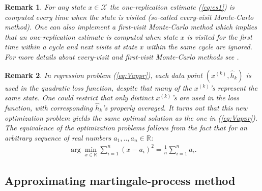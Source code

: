 \documentclass[11pt]{article}
\newcommand{\R}{\mathbb{R}}
\newcommand{\X}{\mathcal{X}}
\newtheorem{remark}{Remark}
\theoremstyle{definition}
\numberwithin{equation}{section}
\begin{document}
\begin{remark}
For any state $x\in \X$ the one-replication estimate (\ref{eq:es1}) is computed every time when the state is visited (so-called \textit{every-visit} Monte-Carlo method). One can also implement a \textit{first-visit}  Monte-Carlo method which implies that
an one-replication estimate is computed when state $x$ is visited for the first time within a cycle
 and next visits at state $x$ within the same cycle are ignored. For more details about every-visit and first-visit Monte-Carlo methods see \cite[Section 5.1]{Sutton2018}.
\end{remark}
\begin{remark}
  In regression problem (\ref{eq:Vappr}), each data point
    $(x^{(k)}, \hat h_k)$ is used  in the quadratic loss function, despite
    that many of the $x^{(k)}$'s represent the same state. One could restrict that
    \emph{only distinct} $x^{(k)}$'s are used in the loss function, with
    corresponding $\hat h_k$'s properly averaged. It turns out that this
    new optimization problem yields the same optimal solution as the one in (\ref{eq:Vappr}).
The equivalence of the optimization problems follows from the fact that for an arbitrary sequence of real numbers $a_1, ..,a_n\in \R$:
\begin{align*}%
 \arg\min_{x\in \R} \sum\limits_{i=1}^n (x-a_i)^2 =  \frac{1}{n}\sum\limits_{i=1}^n a_i.
\end{align*}

 \end{remark}




\subsection{Approximating martingale-process method}\label{sec:AMP}



\end{document}
